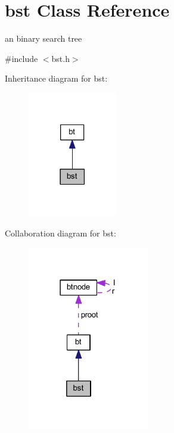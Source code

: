 \hypertarget{classbst}{\section{bst Class Reference}
\label{classbst}
}


an binary search tree  




{\ttfamily \#include $<$bst.\-h$>$}



Inheritance diagram for bst\-:
\nopagebreak
\begin{figure}[H]
\begin{center}
\leavevmode
\includegraphics[width=110pt]{classbst__inherit__graph}
\end{center}
\end{figure}


Collaboration diagram for bst\-:
\nopagebreak
\begin{figure}[H]
\begin{center}
\leavevmode
\includegraphics[width=150pt]{classbst__coll__graph}
\end{center}
\end{figure}
